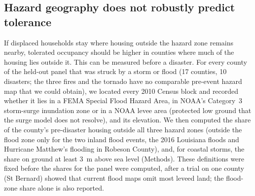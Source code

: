 \documentclass[11pt]{article}
\begin{document}
\subsection{Hazard geography does not robustly predict tolerance}
If displaced households stay where housing outside the hazard zone remains nearby, tolerated occupancy should be higher in counties where much of the housing lies outside it. This can be measured before a disaster. For every county of the held-out panel that was struck by a storm or flood (17 counties, 10 disasters; the three fires and the tornado have no comparable pre-event hazard map that we could obtain), we located every 2010 Census block and recorded whether it lies in a FEMA Special Flood Hazard Area, in NOAA's Category~3 storm-surge inundation zone or in a NOAA levee area (protected low ground that the surge model does not resolve), and its elevation. We then computed the share of the county's pre-disaster housing outside all three hazard zones (outside the flood zone only for the two inland flood events, the 2016 Louisiana floods and Hurricane Matthew's flooding in Robeson County), and, for coastal storms, the share on ground at least 3~m above sea level (Methods). These definitions were fixed before the shares for the panel were computed, after a trial on one county (St Bernard) showed that current flood maps omit most leveed land; the flood-zone share alone is also reported.
\end{document}
